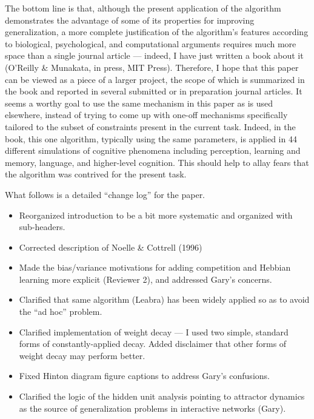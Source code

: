 \documentclass [11pt]{letter}
\begin{document}
\begin{letter}
The bottom line is that, although the present application of the
algorithm demonstrates the advantage of some of its properties for
improving generalization, a more complete justification of the
algorithm's features according to biological, psychological, and
computational arguments requires much more space than a single
journal article --- indeed, I have just written a book about it
(O'Reilly \& Munakata, in press, MIT Press).  Therefore, I hope that
this paper can be viewed as a piece of a larger project, the scope of
which is summarized in the book and reported in several submitted or
in preparation journal articles.  It seems a worthy goal to use the
same mechanism in this paper as is used elsewhere, instead of trying
to come up with one-off mechanisms specifically tailored to the subset
of constraints present in the current task.  Indeed, in the book, this
one algorithm, typically using the same parameters, is applied in 44
different simulations of cognitive phenomena including perception,
learning and memory, language, and higher-level cognition.  This
should help to allay fears that the algorithm was contrived for the
present task.

What follows is a detailed ``change log'' for the paper.

\begin{itemize}
\item Reorganized introduction to be a bit more systematic and
  organized with sub-headers.

\item Corrected description of Noelle \& Cottrell (1996)

\item Made the bias/variance motivations for adding competition and
  Hebbian learning more explicit (Reviewer 2), and addressed Gary's
  concerns.

\item Clarified that same algorithm (Leabra) has been widely applied so as
  to avoid the ``ad hoc'' problem.
  
\item Clarified implementation of weight decay --- I used two simple,
  standard forms of constantly-applied decay.  Added disclaimer that
  other forms of weight decay may perform better.

\item Fixed Hinton diagram figure captions to address Gary's confusions.

\item Clarified the logic of the hidden unit analysis pointing to
  attractor dynamics as the source of generalization problems in
  interactive networks (Gary).


\end{itemize}
\end{letter}
\end{document}
